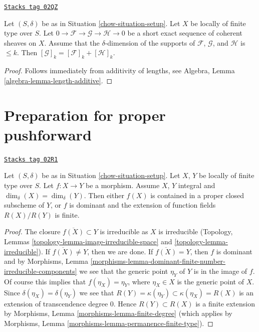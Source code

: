 \begin{lemma}
\label{chow-lemma-additivity-sheaf-cycle}
\href{https://stacks.math.columbia.edu/tag/02QZ}{\texttt{Stacks tag 02QZ}}

Let $(S, \delta)$ be as in Situation \ref{chow-situation-setup}.
Let $X$ be locally of finite type over $S$.
Let $0 \to \mathcal{F} \to \mathcal{G} \to \mathcal{H} \to 0$
be a short exact sequence of coherent sheaves on $X$.
Assume that the $\delta$-dimension of the supports
of $\mathcal{F}$, $\mathcal{G}$, and $\mathcal{H}$ is $\leq k$.
Then $[\mathcal{G}]_k = [\mathcal{F}]_k + [\mathcal{H}]_k$.
\end{lemma}

\begin{proof}
Follows immediately from additivity of lengths, see
Algebra, Lemma \ref{algebra-lemma-length-additive}.
\end{proof}

\section{Preparation for proper pushforward}
\label{chow-section-preparation-pushforward}
\begin{lemma}
\label{chow-lemma-equal-dimension}
\href{https://stacks.math.columbia.edu/tag/02R1}{\texttt{Stacks tag 02R1}}

Let $(S, \delta)$ be as in Situation \ref{chow-situation-setup}.
Let $X$, $Y$ be locally of finite type over $S$.
Let $f : X \to Y$ be a morphism.
Assume $X$, $Y$ integral and $\dim_\delta(X) = \dim_\delta(Y)$.
Then either $f(X)$ is contained in a proper closed subscheme
of $Y$, or $f$ is dominant and the extension of function fields
$R(X)/R(Y)$ is finite.
\end{lemma}

\begin{proof}
The closure $\overline{f(X)} \subset Y$ is irreducible as $X$
is irreducible (Topology, Lemmas
\ref{topology-lemma-image-irreducible-space} and
\ref{topology-lemma-irreducible}).
If $\overline{f(X)} \not = Y$, then we are done.
If $\overline{f(X)} = Y$, then $f$ is dominant and by
Morphisms,
Lemma \ref{morphisms-lemma-dominant-finite-number-irreducible-components}
we see that the generic point $\eta_Y$ of $Y$ is in the image of $f$.
Of course this implies that $f(\eta_X) = \eta_Y$, where $\eta_X \in X$
is the generic point of $X$. Since $\delta(\eta_X) = \delta(\eta_Y)$
we see that $R(Y) = \kappa(\eta_Y) \subset \kappa(\eta_X) = R(X)$
is an extension of transcendence degree $0$.
Hence $R(Y) \subset R(X)$ is a finite extension by
Morphisms, Lemma \ref{morphisms-lemma-finite-degree}
(which applies by
Morphisms, Lemma \ref{morphisms-lemma-permanence-finite-type}).
\end{proof}

